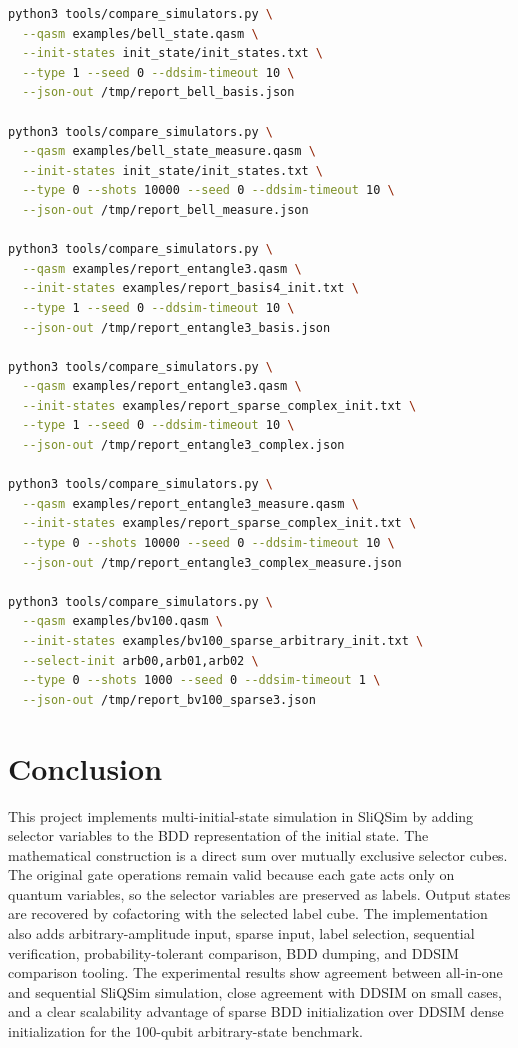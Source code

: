 \documentclass[sigconf,nonacm]{acmart}
\begin{document}
\begin{lstlisting}[language=bash]
python3 tools/compare_simulators.py \
  --qasm examples/bell_state.qasm \
  --init-states init_state/init_states.txt \
  --type 1 --seed 0 --ddsim-timeout 10 \
  --json-out /tmp/report_bell_basis.json

python3 tools/compare_simulators.py \
  --qasm examples/bell_state_measure.qasm \
  --init-states init_state/init_states.txt \
  --type 0 --shots 10000 --seed 0 --ddsim-timeout 10 \
  --json-out /tmp/report_bell_measure.json

python3 tools/compare_simulators.py \
  --qasm examples/report_entangle3.qasm \
  --init-states examples/report_basis4_init.txt \
  --type 1 --seed 0 --ddsim-timeout 10 \
  --json-out /tmp/report_entangle3_basis.json

python3 tools/compare_simulators.py \
  --qasm examples/report_entangle3.qasm \
  --init-states examples/report_sparse_complex_init.txt \
  --type 1 --seed 0 --ddsim-timeout 10 \
  --json-out /tmp/report_entangle3_complex.json

python3 tools/compare_simulators.py \
  --qasm examples/report_entangle3_measure.qasm \
  --init-states examples/report_sparse_complex_init.txt \
  --type 0 --shots 10000 --seed 0 --ddsim-timeout 10 \
  --json-out /tmp/report_entangle3_complex_measure.json

python3 tools/compare_simulators.py \
  --qasm examples/bv100.qasm \
  --init-states examples/bv100_sparse_arbitrary_init.txt \
  --select-init arb00,arb01,arb02 \
  --type 0 --shots 1000 --seed 0 --ddsim-timeout 1 \
  --json-out /tmp/report_bv100_sparse3.json
\end{lstlisting}

\section{Conclusion}
This project implements multi-initial-state simulation in SliQSim by adding selector variables to the BDD representation of the initial state. The mathematical construction is a direct sum over mutually exclusive selector cubes. The original gate operations remain valid because each gate acts only on quantum variables, so the selector variables are preserved as labels. Output states are recovered by cofactoring with the selected label cube. The implementation also adds arbitrary-amplitude input, sparse input, label selection, sequential verification, probability-tolerant comparison, BDD dumping, and DDSIM comparison tooling. The experimental results show agreement between all-in-one and sequential SliQSim simulation, close agreement with DDSIM on small cases, and a clear scalability advantage of sparse BDD initialization over DDSIM dense initialization for the 100-qubit arbitrary-state benchmark.
\end{document}

